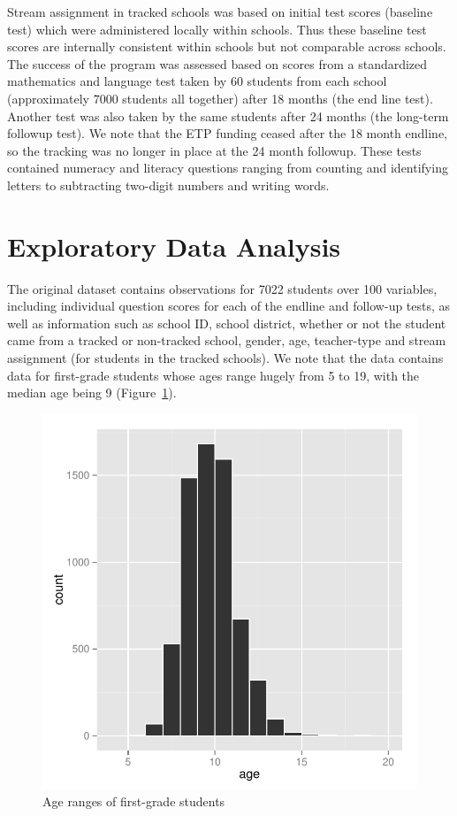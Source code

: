 \documentclass[11pt]{article}
\begin{document}
Stream assignment in tracked schools was based on initial test scores (baseline test) which were administered locally within schools. Thus these baseline test scores are internally consistent within schools but not comparable across schools. The success of the program was assessed based on scores from a standardized mathematics and language test taken by 60 students from each school (approximately 7000 students all together) after 18 months (the end line test). Another test was also taken by the same students after 24 months (the long-term followup test). We note that the ETP funding ceased after the 18 month endline, so the tracking was no longer in place at the 24 month followup. These tests contained numeracy and literacy questions ranging from counting and identifying letters to subtracting two-digit numbers and writing words.
 
 \section{Exploratory Data Analysis}
 The original dataset contains observations for 7022 students over 100 variables, including individual question scores for each of the endline and follow-up tests, as well as information such as school ID, school district, whether or not the student came from a tracked or non-tracked school, gender, age, teacher-type and stream assignment (for students in the tracked schools). We note that the data contains data for first-grade students whose ages range hugely from 5 to 19, with the median age being 9 (Figure~\ref{fig:age}).
 
  \begin{figure}[h]
 \centering
 \includegraphics[scale=0.6]{age.pdf}
 \caption{Age ranges of first-grade students}
 \label{fig:age}
 \end{figure} 
 
\end{document}
